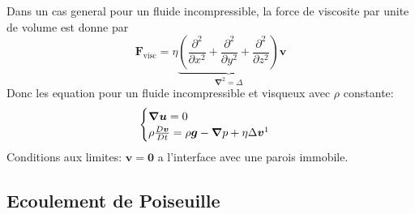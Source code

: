 Dans un cas general pour un fluide incompressible, la force de viscosite par unite de volume est donne par
$$
\boldsymbol{F}_{\mathrm{visc}}=\eta\underbrace{ \left( \frac{ \partial^{2} }{ \partial x^{2} } +\frac{ \partial^{2} }{ \partial y^{2} } +\frac{ \partial^{2} }{ \partial z^{2} }  \right) }_{ \boldsymbol{\nabla}^{2} =\Delta}\boldsymbol{v}
$$
Donc les equation pour un fluide incompressible et visqueux avec $\rho$ constante:
$$
\begin{cases}
\boldsymbol{\nabla u}=0 \\
\rho  \frac{D\boldsymbol{v}}{Dt}=\rho \boldsymbol{g}-\boldsymbol{\nabla}p+\eta\Delta \boldsymbol{v}\footnotemark{}
\end{cases}
$$
Conditions aux limites: $\boldsymbol{v}=\boldsymbol{0}$ a l'interface avec une parois immobile.


\subsection{Ecoulement de Poiseuille}
